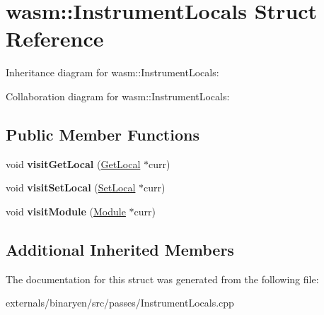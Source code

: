 \hypertarget{structwasm_1_1_instrument_locals}{}\section{wasm\+:\+:Instrument\+Locals Struct Reference}
\label{structwasm_1_1_instrument_locals}


Inheritance diagram for wasm\+:\+:Instrument\+Locals\+:


Collaboration diagram for wasm\+:\+:Instrument\+Locals\+:
\subsection*{Public Member Functions}
\begin{DoxyCompactItemize}
\item 
\mbox{\label{structwasm_1_1_instrument_locals_af92692aea612c16d9e6b6c157be0712e}} 
void {\bfseries visit\+Get\+Local} (\mbox{\hyperlink{classwasm_1_1_get_local}{Get\+Local}} $\ast$curr)
\item 
\mbox{\label{structwasm_1_1_instrument_locals_aef0cfd9fe2482ccb7d354de449d016ad}} 
void {\bfseries visit\+Set\+Local} (\mbox{\hyperlink{classwasm_1_1_set_local}{Set\+Local}} $\ast$curr)
\item 
\mbox{\label{structwasm_1_1_instrument_locals_a820a03aaffc0c7c8af5b0e6461551acf}} 
void {\bfseries visit\+Module} (\mbox{\hyperlink{classwasm_1_1_module}{Module}} $\ast$curr)
\end{DoxyCompactItemize}
\subsection*{Additional Inherited Members}


The documentation for this struct was generated from the following file\+:\begin{DoxyCompactItemize}
\item 
externals/binaryen/src/passes/Instrument\+Locals.\+cpp\end{DoxyCompactItemize}
